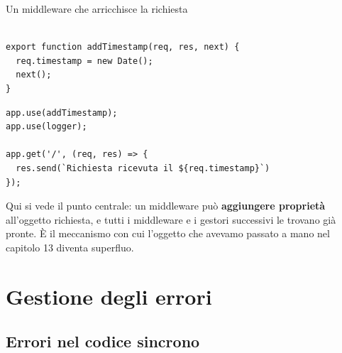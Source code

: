 
\begin{esempio}{Un middleware che arricchisce la richiesta}
\begin{affianco}[0.52]
\begin{lstlisting}[style=js, name=middleware.js, firstnumber=5]

export function addTimestamp(req, res, next) {
  req.timestamp = new Date();
  next();
}
\end{lstlisting}
\begin{lstlisting}[style=js, name=index.js]
app.use(addTimestamp);
app.use(logger);

app.get('/', (req, res) => {
  res.send(`Richiesta ricevuta il ${req.timestamp}`)
});
\end{lstlisting}
\risultato
\begin{immagine}
\end{immagine}
\end{affianco}

Qui si vede il punto centrale: un middleware può \textbf{aggiungere proprietà}
all'oggetto richiesta, e tutti i middleware e i gestori successivi le trovano
già pronte. È il meccanismo con cui l'oggetto  che avevamo
passato a mano nel capitolo 13 diventa superfluo.
\end{esempio}

\section{Gestione degli errori}

\subsection{Errori nel codice sincrono}

